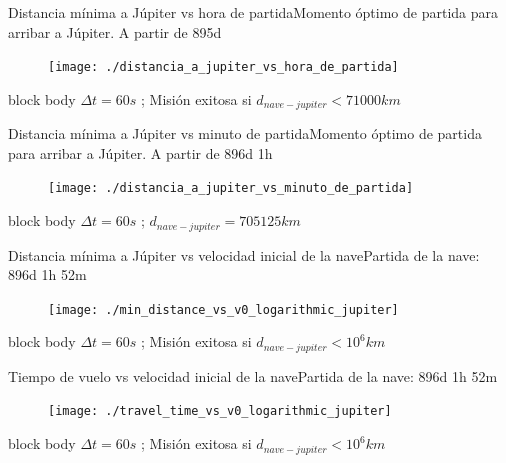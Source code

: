 \documentclass{beamer}
\begin{document}
            \begin{frame}{Distancia mínima a Júpiter vs hora de partida}{Momento óptimo de partida para arribar a Júpiter. A partir de 895d}
                \begin{figure}[H!]
                    \texttt{[image: ./distancia\_a\_jupiter\_vs\_hora\_de\_partida]}
                    \label{fig:jupiter_4}
                \end{figure}
                \begin{beamercolorbox}[sep=5pt,center]{block body}
                    \centering
                    \small{$\Delta t = 60s$ ; Misión exitosa si $d_{nave-jupiter} < 71000 km$}
                \end{beamercolorbox}
            \end{frame}

            \begin{frame}{Distancia mínima a Júpiter vs minuto de partida}{Momento óptimo de partida para arribar a Júpiter. A partir de 896d 1h}
                \begin{figure}[H!]
                    \texttt{[image: ./distancia\_a\_jupiter\_vs\_minuto\_de\_partida]}
                    \label{fig:jupiter_5}
                \end{figure}
                \begin{beamercolorbox}[sep=5pt,center]{block body}
                    \centering
                    \small{$\Delta t = 60s$ ; $d_{nave-jupiter} = 705125 km$}
                \end{beamercolorbox}
            \end{frame}

            \begin{frame}{Distancia mínima a Júpiter vs velocidad inicial de la nave}{Partida de la nave: 896d 1h 52m}
                \begin{figure}[H!]
                    \texttt{[image: ./min\_distance\_vs\_v0\_logarithmic\_jupiter]}
                    \label{fig:jupiter_6}
                \end{figure}
                \begin{beamercolorbox}[sep=5pt,center]{block body}
                    \centering
                    \small{$\Delta t = 60s$ ; Misión exitosa si $d_{nave-jupiter} < 10^6 km$}
                \end{beamercolorbox}
            \end{frame}

            \begin{frame}{Tiempo de vuelo vs velocidad inicial de la nave}{Partida de la nave: 896d 1h 52m}
                \begin{figure}[H!]
                    \texttt{[image: ./travel\_time\_vs\_v0\_logarithmic\_jupiter]}
                    \label{fig:jupiter_7}
                \end{figure}
                \begin{beamercolorbox}[sep=5pt,center]{block body}
                    \centering
                    \small{$\Delta t = 60s$ ; Misión exitosa si $d_{nave-jupiter} < 10^6 km$}
                \end{beamercolorbox}
            \end{frame}
\end{document}

